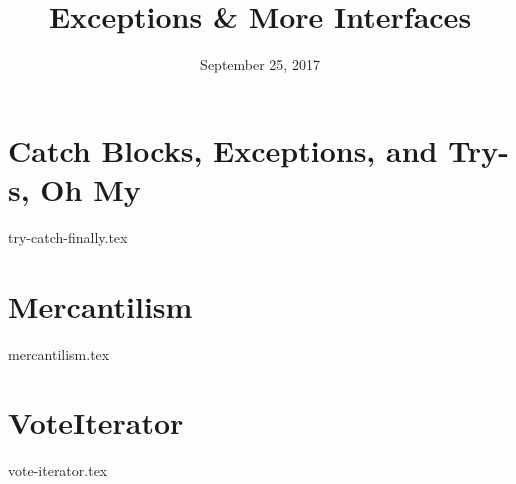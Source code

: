 \documentclass[11pt]{exam}
\title{Exceptions \& More Interfaces}
\date{September 25, 2017}
\begin{document}
\maketitle

\section{Catch Blocks, Exceptions, and Try-s, Oh My}
\begin{questions}
{try-catch-finally.tex}
\end{questions}

\section{Mercantilism}
\begin{questions}
{mercantilism.tex}
\end{questions}

\section{VoteIterator}
\begin{questions}
{vote-iterator.tex}
\end{questions}
\end{document}
